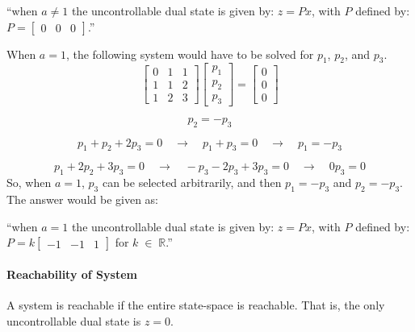 ``when $a\neq1$ the uncontrollable dual state is given by: $z=Px$, with $P$ defined by: $P=\begin{bmatrix} 0 & 0 & 0 \end{bmatrix}$.''

When $a=1$, the following system would have to be solved for $p_{1}$, $p_{2}$, and $p_{3}$.
\begin{equation*}
  \begin{bmatrix}
    0 & 1 & 1 \\
    1 & 1 & 2 \\
    1 & 2 & 3
  \end{bmatrix}
  \begin{bmatrix}
    p_{1} \\
    p_{2} \\
    p_{3}
  \end{bmatrix}=
  \begin{bmatrix}
    0 \\
    0 \\
    0
  \end{bmatrix}
\end{equation*}

\begin{equation*}
  p_{2}=-p_{3}
\end{equation*}

\begin{equation*}
  p_{1}+p_{2}+2p_{3}=0\quad\rightarrow\quad p_{1}+p_{3}=0\quad\rightarrow\quad p_{1}=-p_{3}
\end{equation*}

\begin{equation*}
  p_{1}+2p_{2}+3p_{3}=0\quad\rightarrow\quad -p_{3}-2p_{3}+3p_{3}=0\quad\rightarrow\quad 0p_{3}=0
\end{equation*}
So, when $a=1$, $p_{3}$ can be selected arbitrarily, and then $p_{1}=-p_{3}$ and $p_{2}=-p_{3}$.
The answer would be given as:

``when $a=1$ the uncontrollable dual state is given by: $z=Px$, with $P$ defined by: $P=k\begin{bmatrix} -1 & -1 & 1 \end{bmatrix}$ for $k\;\in\;\mathbb{R}$.''

\paragraph{Reachability of System} A system is reachable if the entire state-space is reachable.
That is, the only uncontrollable dual state is $z=0$.

